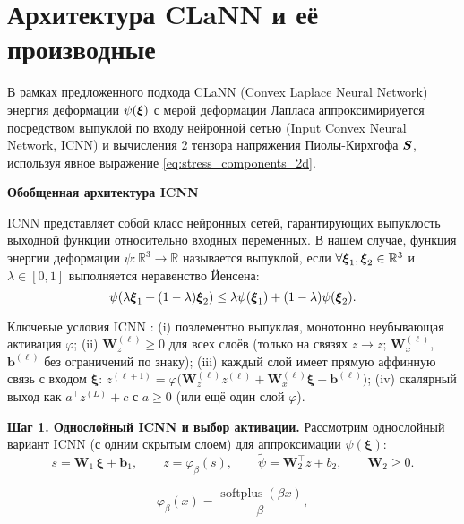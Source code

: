 \section{Архитектура CLaNN и её производные}

В рамках предложенного подхода CLaNN (Convex Laplace Neural Network)
энергия деформации \(\psi(\boldsymbol{\xi})\) с мерой деформации Лапласа аппроксимириуется посредством 
выпуклой по входу нейронной сетью (Input Convex Neural Network, ICNN) \cite{icnn2017}
и вычисления 2 тензора напряжения Пиолы-Кирхгофа \(\boldsymbol{S}\), используя явное выражение \eqref{eq:stress_components_2d}. 

\textbf{Обобщенная архитектура ICNN}

ICNN представляет собой класс нейронных сетей, гарантирующих выпуклость выходной функции относительно входных переменных. 
В нашем случае, функция энергии деформации $\psi: \mathbb{R}^3 \rightarrow \mathbb{R}$ называется выпуклой, 
если $\forall \boldsymbol{\xi}_1, \boldsymbol{\xi}_2 \in \mathbb{R}^3$ и $\lambda \in [0,1]$ выполняется неравенство Йенсена:
\begin{equation}
\psi(\lambda \boldsymbol{\xi}_1 + (1-\lambda) \boldsymbol{\xi}_2) \leq \lambda \psi(\boldsymbol{\xi}_1) + (1-\lambda) \psi(\boldsymbol{\xi}_2).
\label{eq:convexity_definition}
\end{equation}

Ключевые условия ICNN \cite{icnn2017}: 
(i) поэлементно выпуклая, монотонно неубывающая активация $\varphi$; 
(ii) $\mathbf{W}_z^{(\ell)}\!\ge\!0$ для всех слоёв 
(только на связях $z\!\to\!z$; $\mathbf{W}_x^{(\ell)}$, $\mathbf{b}^{(\ell)}$ без ограничений по знаку); 
(iii) каждый слой имеет прямую аффинную связь с входом 
$\boldsymbol{\xi}$: $z^{(\ell+1)}=\varphi\!\big(\mathbf{W}_z^{(\ell)}z^{(\ell)}+\mathbf{W}_x^{(\ell)}\boldsymbol{\xi}+\mathbf{b}^{(\ell)}\big)$; 
(iv) скалярный выход как $a^{\top} z^{(L)}+c$ с $a\!\ge\!0$ (или ещё один слой $\varphi$).

\textbf{Шаг 1. Однослойный ICNN и выбор активации.}
Рассмотрим однослойный вариант ICNN (с одним скрытым слоем) для аппроксимации $\psi(\boldsymbol{\xi})$:
\begin{equation}
  s = \mathbf{W}_1 \,\boldsymbol{\xi} + \mathbf{b}_1,\qquad
  z = \varphi_{\beta}(s),\qquad
  \tilde{\psi} = \mathbf{W}_2^{\top} z + b_2,\qquad \mathbf{W}_2 \ge 0.
  \label{eq:icnn_onelayer}
\end{equation}

\begin{equation}
  \varphi_{\beta}(x) = \frac{\operatorname{softplus}(\beta x)}{\beta},
  \label{eq:softplus_activation}
\end{equation}


